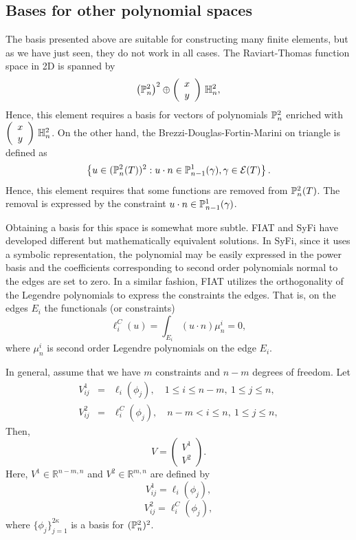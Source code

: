 \subsection{Bases for other polynomial spaces}
The basis presented above are suitable for constructing many finite
elements, but as we have just seen, they do not work in all cases.
The Raviart-Thomas function space in 2D is spanned by
\[
\left( \P^2_n \right)^2 \oplus
\left(\begin{array}{c} x \\y \end{array} \right) \, \H^2_n, 
\]
Hence, this element requires a basis for vectors of polynomials  $\P^2_n$  enriched with 
$ \left(\begin{array}{c} x \\y \end{array} \right)  \, \H^2_n$.
On the other hand,  the Brezzi-Douglas-Fortin-Marini on triangle is defined as  
\begin{equation}
\left\{
u \in (\P^2_n (T) )^2 : u \cdot n \in \P^1_{n-1}(\gamma), \gamma \in \mathcal{E}(T)
\right\}.
\end{equation}
Hence, this element requires that some functions are removed from   
$\P^2_n (T)$. The removal is expressed by the constraint  $u \cdot n \in \P^1_{n-1}(\gamma)$.

Obtaining a basis for this space is somewhat more subtle.  
FIAT and SyFi have developed different
but mathematically equivalent solutions.  
In SyFi, since it uses a symbolic representation, the polynomial may be easily expressed 
in the power basis and the coefficients corresponding to second order polynomials 
normal to the edges are set to zero. In a similar fashion, FIAT utilizes the orthogonality of the Legendre polynomials  
 to express the constraints the edges. That is, on the edges $E_i$ the functionals (or constraints)    
\[
\ell^C_i( u ) = \int_{E_i} (u \cdot n) \mu_n^i = 0,  
\]
where $\mu_n^i$ is second order Legendre polynomials on the edge $E_i$.  


In general, assume that we have $m$ constraints and $n-m$ degrees of freedom.
Let 
\begin{eqnarray}
V^1_{ij} &=& \ell_i( \phi_j ), \quad  1\le i \le n-m, \  1\le j \le n,  \\
V^2_{ij} &=& \ell^C_i( \phi_j ), \quad  n-m  < i \le n, \  1\le j \le n, 
\end{eqnarray}
Then,
\begin{equation}
V = \left( \begin{array}{c} V^1 \\ V^2 \end{array} \right).
\end{equation}
Here, \( V^1 \in \mathbb{R}^{n-m, n} \) and
\( V^2 \in \mathbb{R}^{m, n} \) are defined
by
\[V^1_{ij} = \ell_i( \phi_j ),
\]
\[
V^2_{ij} = \ell^C_i( \phi_j ),
\]
where \( \{ \phi_j \}_{j=1}^{2 \kappa} \) is a basis for \( (\P^2_n)^2
\).

